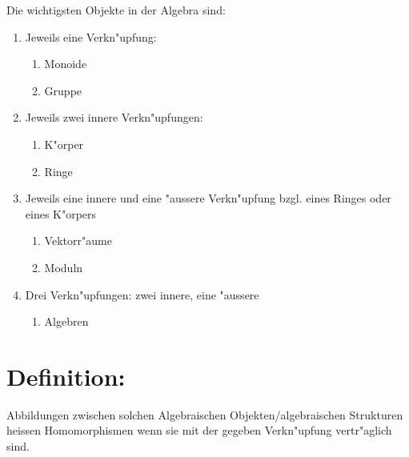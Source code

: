 \documentclass[12pt,a4paper,ngerman]{scrreprt}
\begin{document}
Die wichtigsten Objekte in der Algebra sind:

\begin{enumerate}[]

\item Jeweils eine Verkn"upfung:

\begin{enumerate}[]
\item Monoide
\item Gruppe
\end{enumerate}

\item Jeweils zwei innere Verkn"upfungen:

\begin{enumerate}[]
\item K"orper
\item Ringe
\end{enumerate}

\item Jeweils eine innere und eine "aussere Verkn"upfung bzgl. eines Ringes oder eines K"orpers

\begin{enumerate}[]
\item Vektorr"aume
\item Moduln
\end{enumerate}

\item Drei Verkn"upfungen: zwei innere, eine "aussere

\begin{enumerate}[]
\item Algebren
\end{enumerate}

\end{enumerate}

\section{Definition:}

Abbildungen zwischen solchen Algebraischen Objekten/algebraischen Strukturen heissen Homomorphismen wenn sie mit der gegeben Verkn"upfung vertr"aglich sind.

\end{document}

